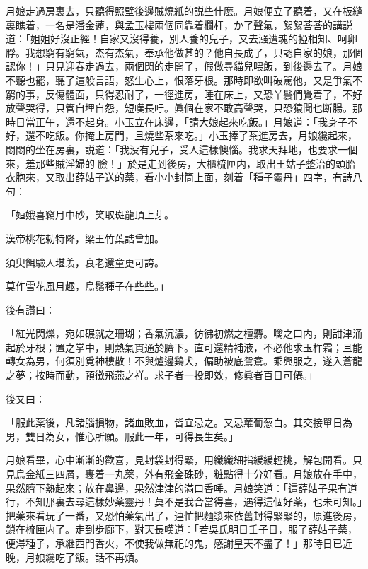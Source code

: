 月娘走過房裏去，只聽得照壁後邊賊燒紙的説些什麽。月娘便立了聽着，又在板縫裏瞧着，一名是潘金蓮，與孟玉樓兩個同靠着欄杆，か了聲氣，絮絮荅荅的講説道：「姐姐好沒正經！自家又沒得養，別人養的兒子，又去漒遭魂的掗相知、呵卵脬。我想窮有窮氣，杰有杰氣，奉承他做甚的？他自長成了，只認自家的娘，那個認你！」只見迎春走過去，兩個閃的走開了，假做尋貓兒喂飯，到後邊去了。月娘不聽也罷，聽了這般言語，怒生心上，恨落牙根。那時即欲叫破駡他，又是爭氣不窮的事，反傷體面，只得忍耐了，一徑進房，睡在床上，又恐丫鬟們覺着了，不好放聲哭得，只管自埋自怨，短嘆長吁。眞個在家不敢高聲哭，只恐猿聞也断腸。那時日當正午，還不起身。小玉立在床邊，「請大娘起來吃飯。」月娘道：「我身子不好，還不吃飯。你掩上房門，且燒些茶來吃。」小玉捧了茶進房去，月娘纔起來，悶悶的坐在房裏，説道：「我没有兒子，受人這樣懊惱。我求天拜地，也要求一個來，羞那些賊淫婦的𣭈臉！」於是走到後房，大櫃梳匣内，取出王姑子整治的頭胎衣胞來，又取出薛姑子送的薬，看小小封筒上面，刻着「種子靈丹」四字，有詩八句：

\begin{myquote}
「姮娥喜竊月中砂，笑取斑龍頂上芽。

漢帝桃花勅特降，梁王竹葉誥曾加。

須臾餌驗人堪羡，衰老還童更可誇。

莫作雪花風月趣，烏鬚種子在些些。」
\end{myquote}

後有讚曰：

\begin{myquote}
「紅光閃爍，宛如碾就之珊瑚；香氣沉濃，彷彿初燃之檀麝。噙之口内，則甜津涌起於牙根；置之掌中，則熱氣貫通於臍下。直可還精補液，不必他求玉杵霜；且能轉女為男，何須別覓神樓散！不與爐邊鷄犬，偏助被底鴛鴦。乘興服之，遂入蒼龍之夢；按時而動，預徵飛燕之祥。求子者一投即效，修眞者百日可僊。」
\end{myquote}

後又曰：

\begin{myquote}
「服此薬後，凡諸腦損物，諸血敗血，皆宜忌之。又忌蘿蔔葱白。其交接單日為男，雙日為女，惟心所願。服此一年，可得長生矣。」
\end{myquote}

月娘看畢，心中漸漸的歡喜，見封袋封得緊，用纖纖細指緩緩輕挑，解包開看。只見烏金紙三四層，裹着一丸薬，外有飛金硃砂，粧點得十分好看。月娘放在手中，果然臍下熱起來；放在鼻邊，果然津津的滿口香唾。月娘笑道：「這薛姑子果有道行，不知那裏去尋這樣妙薬靈丹！莫不是我合當得喜，遇得這個好薬，也未可知。」把薬來看玩了一番，又恐怕薬氣出了，連忙把麵漿來依舊封得緊緊的，原進後房，鎖在梳匣内了。走到步廊下，對天長嘆道：「若吳氏明日壬子日，服了薛姑子薬，便淂種子，承継西門香火，不使我做無祀的鬼，感謝皇天不盡了！」那時日已近晚，月娘纔吃了飯。話不再煩。

